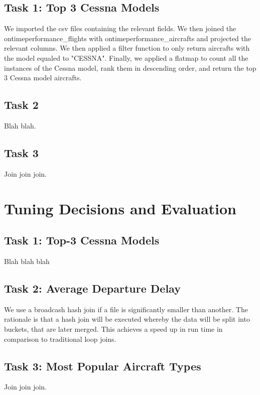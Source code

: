 \documentclass[12pt]{article}
\begin{document}
\subsection*{Task 1: Top 3 Cessna Models}
We imported the csv files containing the relevant fields. We then joined the ontimeperformance\_flights with ontimeperformance\_aircrafts and projected the relevant columns. We then applied a filter function to only return aircrafts with the model equaled to "CESSNA". Finally, we applied a flatmap to count all the instances of the Cessna model, rank them in descending order, and return the top 3 Cessna model aircrafts.
\subsection*{Task 2}
Blah blah.
\subsection*{Task 3}
Join join join.
\newpage{}

{}
\section*{Tuning Decisions and Evaluation}
\subsection*{Task 1: Top-3 Cessna Models}
Blah blah blah
\subsection*{Task 2: Average Departure Delay}
We use a broadcash hash join if a file is significantly smaller than another. The rationale is that a hash join will be executed whereby the data will be split into buckets, that are later merged. This achieves a speed up in run time in comparison to traditional loop joins.
\subsection*{Task 3: Most Popular Aircraft Types}
Join join join.
\newpage{}


{}
\end{document}
